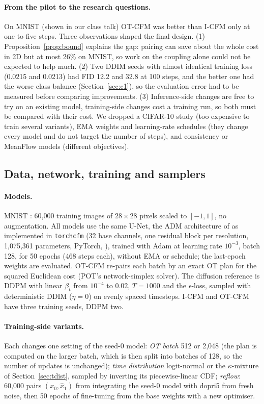 \paragraph{From the pilot to the research questions.} On MNIST (shown in our class talk) OT-CFM was better than I-CFM only at one to five steps. Three observations shaped the final design. (1) Proposition~\ref{prop:bound} explains the gap: pairing can save about the whole cost in 2D but at most 26\% on MNIST, so work on the coupling alone could not be expected to help much. (2) Two DDIM seeds with almost identical training loss (0.0215 and 0.0213) had FID 12.2 and 32.8 at 100 steps, and the better one had the worse class balance (Section~\ref{sec:c1}), so the evaluation error had to be measured before comparing improvements. (3) Inference-side changes are free to try on an existing model, training-side changes cost a training run, so both must be compared with their cost. We dropped a CIFAR-10 study (too expensive to train several variants), EMA weights and learning-rate schedules (they change every model and do not target the number of steps), and consistency or MeanFlow models (different objectives).

\subsection{Data, network, training and samplers}\label{sec:setup}
\paragraph{Models.} MNIST \citep{lecun1998mnist}: 60,000 training images of $28\times28$ pixels scaled to $[-1,1]$, no augmentation. All models use the same U-Net, the ADM architecture of \citet{dhariwal2021adm} as implemented in \texttt{torchcfm} \citep{tong2024otcfm} (32 base channels, one residual block per resolution, 1,075,361 parameters, PyTorch, \citealp{paszke2019pytorch}), trained with Adam \citep{kingma2015adam} at learning rate $10^{-3}$, batch 128, for 50 epochs (468 steps each), without EMA or schedule; the last-epoch weights are evaluated. OT-CFM re-pairs each batch by an exact OT plan for the squared Euclidean cost (POT's network-simplex solver). The diffusion reference is DDPM \citep{ho2020ddpm} with linear $\beta_t$ from $10^{-4}$ to $0.02$, $T=1000$ and the $\epsilon$-loss, sampled with deterministic DDIM ($\eta=0$) on evenly spaced timesteps. I-CFM and OT-CFM have three training seeds, DDPM two.
\paragraph{Training-side variants.} Each changes one setting of the seed-0 model: \emph{OT batch} 512 or 2,048 (the plan is computed on the larger batch, which is then split into batches of 128, so the number of updates is unchanged); \emph{time distribution} logit-normal or the $\kappa$-mixture of Section~\ref{sec:tdist}, sampled by inverting its piecewise-linear CDF; \emph{reflow}: 60,000 pairs $(x_0,\hat x_1)$ from integrating the seed-0 model with dopri5 from fresh noise, then 50 epochs of fine-tuning from the base weights with a new optimiser.
